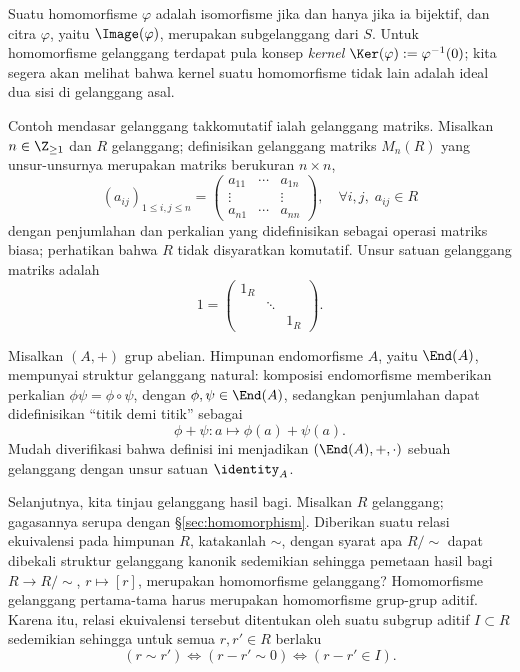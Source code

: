 Suatu homomorfisme $\varphi$ adalah isomorfisme jika dan hanya jika ia bijektif, dan citra $\varphi$, yaitu $\Image(\varphi)$, merupakan subgelanggang dari $S$. Untuk homomorfisme gelanggang terdapat pula konsep \emph{kernel} $\Ker(\varphi) := \varphi^{-1}(0)$; kita segera akan melihat bahwa kernel suatu homomorfisme tidak lain adalah ideal dua sisi di gelanggang asal.

\begin{example}\label{eg:matrix-ring}
	Contoh mendasar gelanggang takkomutatif ialah gelanggang matriks. Misalkan $n \in \Z_{\geq 1}$ dan $R$ gelanggang; definisikan gelanggang matriks $M_n(R)$ yang unsur-unsurnya merupakan matriks berukuran $n \times n$,
	\[ (a_{ij})_{1 \leq i,j \leq n} = \begin{pmatrix}
		a_{11} & \cdots & a_{1n} \\
		\vdots & & \vdots \\
		a_{n1} & \cdots & a_{nn}
	\end{pmatrix}, \quad \forall i,j,\; a_{ij} \in R \]
	dengan penjumlahan dan perkalian yang didefinisikan sebagai operasi matriks biasa; perhatikan bahwa $R$ tidak disyaratkan komutatif. Unsur satuan gelanggang matriks adalah
	\[ 1 = \left( \begin{smallmatrix} 1_R & & \\ & \ddots & \\ & & 1_R \end{smallmatrix} \right). \]
\end{example}

\begin{example}\label{eg:End-ring}
	Misalkan $(A, +)$ grup abelian. Himpunan endomorfisme $A$, yaitu $\End(A)$, mempunyai struktur gelanggang natural: komposisi endomorfisme memberikan perkalian $\phi \psi = \phi \circ \psi$, dengan $\phi, \psi \in \End(A)$, sedangkan penjumlahan dapat didefinisikan ``titik demi titik'' sebagai
	\[ \phi + \psi: a \longmapsto \phi(a) + \psi(a). \]
	Mudah diverifikasi bahwa definisi ini menjadikan $(\End(A), +, \cdot)$ sebuah gelanggang dengan unsur satuan $\identity_A$.
\end{example}

Selanjutnya, kita tinjau gelanggang hasil bagi. Misalkan $R$ gelanggang; gagasannya serupa dengan \S\ref{sec:homomorphism}. Diberikan suatu relasi ekuivalensi pada himpunan $R$, katakanlah $\sim$, dengan syarat apa $R/\sim$ dapat dibekali struktur gelanggang kanonik sedemikian sehingga pemetaan hasil bagi $R \to R/\sim$, $r \mapsto [r]$, merupakan homomorfisme gelanggang? Homomorfisme gelanggang pertama-tama harus merupakan homomorfisme grup-grup aditif. Karena itu, relasi ekuivalensi tersebut ditentukan oleh suatu subgrup aditif $I \subset R$ sedemikian sehingga untuk semua $r, r' \in R$ berlaku
\[ (r \sim r') \iff (r-r' \sim 0) \iff (r-r' \in I). \]

